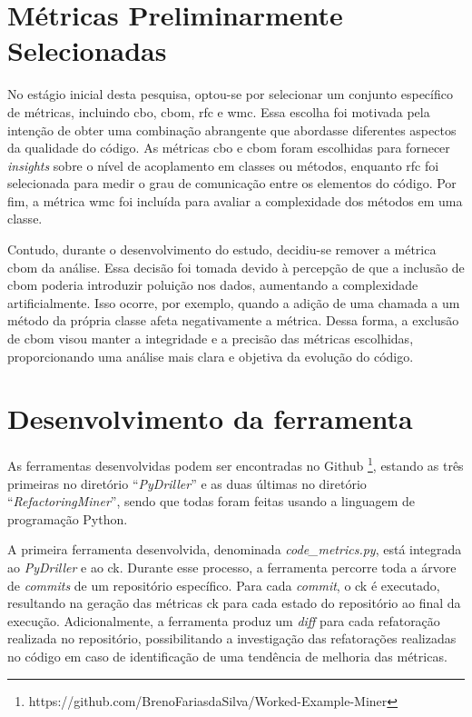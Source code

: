 \section{Métricas Preliminarmente Selecionadas}

No estágio inicial desta pesquisa, optou-se por selecionar um conjunto específico de métricas, incluindo \gls{cbo}, \gls{cbom}, \gls{rfc} e \gls{wmc}. Essa escolha foi motivada pela intenção de obter uma combinação abrangente que abordasse diferentes aspectos da qualidade do código. As métricas \gls{cbo} e \gls{cbom} foram escolhidas para fornecer \textit{insights} sobre o nível de acoplamento em classes ou métodos, enquanto \gls{rfc} foi selecionada para medir o grau de comunicação entre os elementos do código. Por fim, a métrica \gls{wmc} foi incluída para avaliar a complexidade dos métodos em uma classe.

Contudo, durante o desenvolvimento do estudo, decidiu-se remover a métrica \gls{cbom} da análise. Essa decisão foi tomada devido à percepção de que a inclusão de \gls{cbom} poderia introduzir poluição nos dados, aumentando a complexidade artificialmente. Isso ocorre, por exemplo, quando a adição de uma chamada a um método da própria classe afeta negativamente a métrica. Dessa forma, a exclusão de \gls{cbom} visou manter a integridade e a precisão das métricas escolhidas, proporcionando uma análise mais clara e objetiva da evolução do código.

\section{Desenvolvimento da ferramenta}

As ferramentas desenvolvidas podem ser encontradas no Github \footnote{https://github.com/BrenoFariasdaSilva/Worked-Example-Miner}, estando as três primeiras no diretório ``\textit{PyDriller}'' e as duas últimas no diretório ``\textit{RefactoringMiner}'', sendo que todas foram feitas usando a linguagem de programação Python\cite{PythonProgrammingLanguage}.

A primeira ferramenta desenvolvida, denominada \textit{code\_metrics.py}\cite{PyDriller:CodeMetrics:2023}, está integrada ao \textit{PyDriller} e ao \gls{ck}. Durante esse processo, a ferramenta percorre toda a árvore de \textit{commits} de um repositório específico. Para cada \textit{commit}, o \gls{ck} é executado, resultando na geração das métricas \gls{ck} para cada estado do repositório ao final da execução. Adicionalmente, a ferramenta produz um \textit{diff} para cada refatoração realizada no repositório, possibilitando a investigação das refatorações realizadas no código em caso de identificação de uma tendência de melhoria das métricas.

